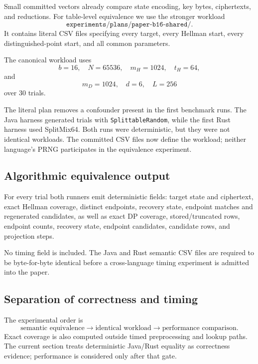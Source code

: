 Small committed vectors already compare state encoding, key bytes, ciphertexts,
and reductions. For table-level equivalence we use the stronger workload
\[
  \texttt{experiments/plans/paper-b16-shared/}.
\]
It contains literal CSV files specifying every target, every Hellman start,
every distinguished-point start, and all common parameters.

The canonical workload uses
\[
  b=16,\quad N=65536,\quad
  m_H=1024,\quad t_H=64,
\]
and
\[
  m_D=1024,\quad d=6,\quad L=256
\]
over 30 trials.

The literal plan removes a confounder present in the first benchmark runs. The
Java harness generated trials with \texttt{SplittableRandom}, while the first
Rust harness used SplitMix64. Both runs were deterministic, but they were not
identical workloads. The committed CSV files now define the workload; neither
language's PRNG participates in the equivalence experiment.

\subsection{Algorithmic equivalence output}

For every trial both runners emit deterministic fields: target state and
ciphertext, exact Hellman coverage, distinct endpoints, recovery state,
endpoint matches and regenerated candidates, as well as exact DP coverage,
stored/truncated rows, endpoint counts, recovery state, endpoint candidates,
candidate rows, and projection steps.

No timing field is included. The Java and Rust semantic CSV files are required
to be byte-for-byte identical before a cross-language timing experiment is
admitted into the paper.

\subsection{Separation of correctness and timing}

The experimental order is
\[
  \text{semantic equivalence}
  \longrightarrow
  \text{identical workload}
  \longrightarrow
  \text{performance comparison}.
\]
Exact coverage is also computed outside timed preprocessing and lookup paths.
The current section treats deterministic Java/Rust equality as correctness
evidence; performance is considered only after that gate.
